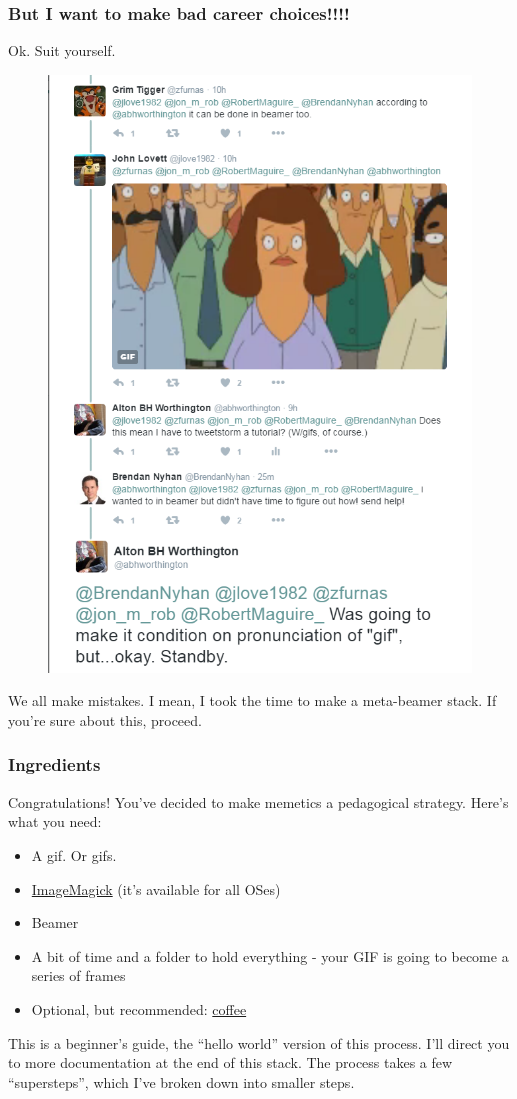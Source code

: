 \documentclass{beamer}
\begin{document}
\begin{frame}
	\frametitle{But I want to make bad career choices!!!!}
	Ok. Suit yourself.
	\begin{figure}
		\centering
		\includegraphics[scale=.25]{genesis.PNG}
	\end{figure}
	We all make mistakes. \pause I mean, I took the time to make a meta-beamer stack. If you're sure about this, proceed.
\end{frame}

\begin{frame}
	\frametitle{Ingredients}
	Congratulations! You've decided to make memetics a pedagogical strategy. Here's what you need:
		\begin{itemize}
			\item A gif. Or gifs.
			\item \href{https://www.imagemagick.org/script/binary-releases.php}{ImageMagick} (it's available for all OSes)
			\item Beamer
			\item A bit of time and a folder to hold everything - your GIF is going to become a series of frames
			\item Optional, but recommended: \href{https://www.roosroast.com/}{coffee}
		\end{itemize}
	This is a beginner's guide, the ``hello world'' version of this process. I'll direct you to more documentation at the end of this stack. The process takes a few ``supersteps'', which I've broken down into smaller steps.
\end{frame}
\end{document}
